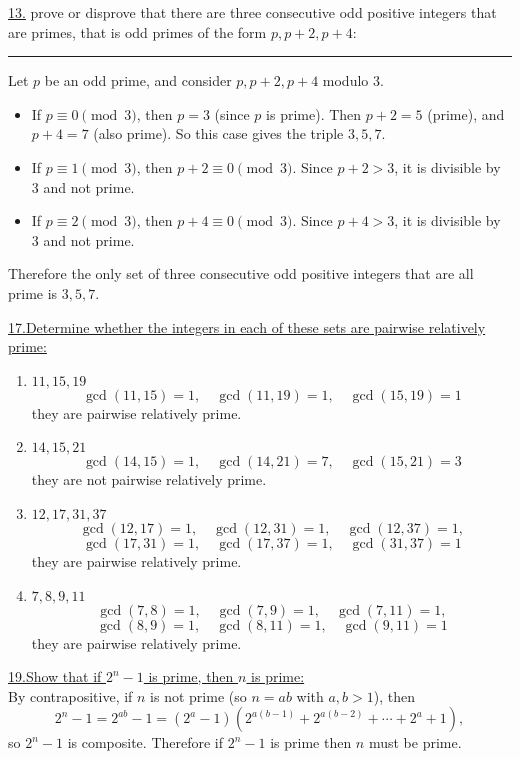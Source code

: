 \documentclass[12pt]{article}
\begin{document}
\vspace{3.3mm}
\noindent\underline{13.} prove or disprove that there are three consecutive odd positive integers that are primes, that is odd primes of the form $p, p+2, p+4$:
\\\rule{\linewidth}{0.5pt}
\indent Let $p$ be an odd prime, and consider $p, p+2, p+4$ modulo $3$.
\begin{itemize}
    \item If $p \equiv 0 \pmod{3}$, then $p=3$ (since $p$ is prime). Then $p+2=5$ (prime), and $p+4=7$ (also prime). So this case gives the triple $3,5,7$.
    \item If $p \equiv 1 \pmod{3}$, then $p+2 \equiv 0 \pmod{3}$. Since $p+2 > 3$, it is divisible by 3 and not prime.
    \item If $p \equiv 2 \pmod{3}$, then $p+4 \equiv 0 \pmod{3}$. Since $p+4 > 3$, it is divisible by 3 and not prime.
\end{itemize}
Therefore the only set of three consecutive odd positive integers that are all prime is $3,5,7$.

\newpage
\noindent\underline{17.\;Determine whether the integers in each of these sets are pairwise relatively prime:}
\begin{enumerate}[label=(\alph*)]
    \item $11, 15 ,19$
    \[
    \gcd(11, 15) = 1, \quad \gcd(11, 19) = 1, \quad \gcd(15, 19) = 1
    \]
    they are pairwise relatively prime.
    \item $14, 15 ,21$
    \[
    \gcd(14, 15) = 1, \quad \gcd(14, 21) = 7, \quad \gcd(15, 21) = 3
    \]
    they are not pairwise relatively prime.
    \item $12, 17, 31 ,37$
    \[
    \gcd(12, 17) = 1, \quad \gcd(12, 31) = 1, \quad \gcd(12, 37) = 1, \] 
    \[\gcd(17, 31) = 1, \quad \gcd(17, 37) = 1, \quad \gcd(31, 37) = 1
    \]
    they are pairwise relatively prime.
    \item $7, 8, 9, 11$
    \[
    \gcd(7, 8) = 1, \quad \gcd(7, 9) = 1, \quad \gcd(7, 11) = 1, \] 
    \[\gcd(8, 9) = 1, \quad \gcd(8, 11) = 1, \quad \gcd(9, 11) = 1
    \]
    they are pairwise relatively prime.
\end{enumerate}

\vspace{5mm}
\noindent\underline{19.\;Show that if $2^n-1$ is prime, then $n$ is prime:}
\\\indent By contrapositive, if $n$ is not prime (so $n = ab$ with $a,b>1$), then
\[
2^n -1 = 2^{ab} -1 = (2^a-1)\left(2^{a(b-1)} + 2^{a(b-2)} + \cdots + 2^a + 1\right),
\]
so \(2^n-1\) is composite. Therefore if \(2^n-1\) is prime then \(n\) must be prime.
\end{document}

